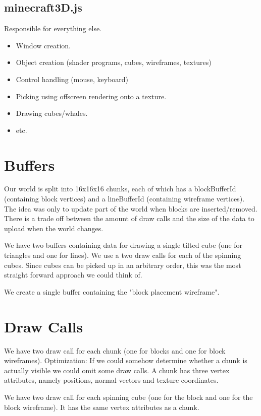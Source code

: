 \documentclass[12pt,leqno]{article}
\begin{document}
\subsection{minecraft3D.js}
Responsible for everything else.

\begin{itemize}
	\item Window creation.
	\item Object creation (shader programs, cubes, wireframes, textures)
	\item Control handling (mouse, keyboard)
	\item Picking using offscreen rendering onto a texture.
	\item Drawing cubes/whales.
	\item etc.
\end{itemize}

\section{Buffers}

Our world is split into 16x16x16 chunks, each of which has a blockBufferId (containing block vertices) and a lineBufferId (containing wireframe vertices).
The idea was only to update part of the world when blocks are inserted/removed. There is a trade off between the amount of draw calls and the size of the data to upload when the world changes.

We have two buffers containing data for drawing a single tilted cube (one for triangles and one for lines). We use a two draw calls for each of the spinning cubes. Since cubes can be picked up in an arbitrary order, this was the most straight forward approach we could think of.

We create a single buffer containing the "block placement wireframe".

\section{Draw Calls}

We have two draw call for each chunk (one for blocks and one for block wireframes). Optimization: If we could somehow determine whether a chunk is actually visible we could omit some draw calls.
A chunk has three vertex attributes, namely positions, normal vectors and texture coordinates.

We have two draw call for each spinning cube (one for the block and one for the block wireframe). It has the same vertex attributes as a chunk.
\end{document}
